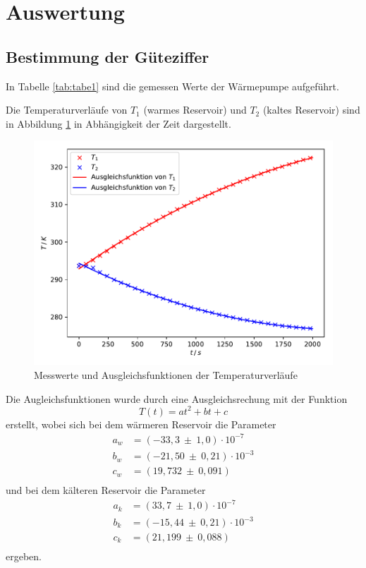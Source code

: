 \section{Auswertung}
\label{sec:Auswertung}
\subsection{Bestimmung der Güteziffer}
In Tabelle \ref{tab:tabe1} sind die gemessen Werte der Wärmepumpe aufgeführt.

\noindent Die Temperaturverläufe von $ T_1 $ (warmes Reservoir) und $ T_2 $ (kaltes
Reservoir) sind in Abbildung \ref{fig:plot1} in Abhängigkeit der Zeit dargestellt.
\begin{figure}[H]
  \centering
  \includegraphics{plot1.pdf}
  \caption{Messwerte und Ausgleichsfunktionen der Temperaturverläufe}
  \label{fig:plot1}
\end{figure}
Die Augleichsfunktionen wurde durch eine Ausgleichsrechung mit der Funktion
\begin{equation}
  T(t) = at^2 +bt +c
\end{equation}
erstellt, wobei sich bei dem wärmeren Reservoir die Parameter
\begin{align*}
  a_w &= (-33,3 \: \pm \: 1,0) \cdot 10^{-7} \\
  b_w &= (-21,50 \: \pm \: 0,21) \cdot 10^{-3} \\
  c_w &= (19,732 \: \pm \: 0,091) \\
\end{align*}
und bei dem kälteren Reservoir die Parameter
\begin{align*}
  a_k &= (33,7 \: \pm \: 1,0) \cdot 10^{-7} \\
  b_k &= (-15,44 \: \pm \: 0,21) \cdot 10^{-3} \\
  c_k &= (21,199 \: \pm \: 0,088) \\
\end{align*}
ergeben.

